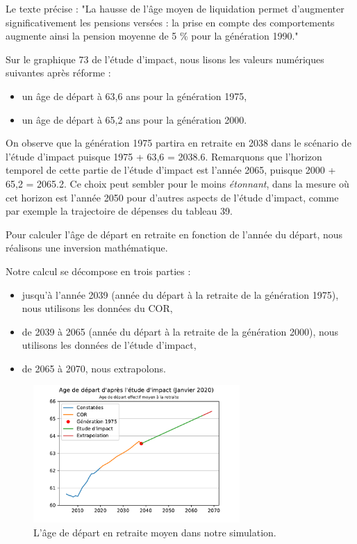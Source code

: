 \documentclass[10pt]{article}
\begin{document}
Le texte précise : "La hausse de l’âge moyen de liquidation permet d’augmenter 
significativement les pensions versées : la prise en compte des comportements 
augmente ainsi la pension moyenne de 5 \% pour la génération 1990."

Sur le graphique 73 de l'étude d'impact, nous lisons les valeurs numériques 
suivantes après réforme :
\begin{itemize}
\item un âge de départ à 63,6 ans pour la génération 1975,
\item un âge de départ à 65,2 ans pour la génération 2000.
\end{itemize}

On observe que la génération 1975 partira en retraite en 2038 dans le scénario de l'étude d'impact puisque 1975 + 63,6 = 2038.6.
Remarquons que l'horizon temporel de cette partie de l'étude d'impact est l'année 2065, puisque 2000 + 65,2 = 2065.2. 
Ce choix peut sembler pour le moins \emph{étonnant}, dans la mesure où cet horizon 
est l'année 2050 pour d'autres aspects de l'étude d'impact, 
comme par exemple la trajectoire de dépenses du tableau 39. 

Pour calculer l'âge de départ en retraite en fonction de l'année du départ, 
nous réalisons une inversion mathématique.  

Notre calcul se décompose en trois parties :
\begin{itemize}
\item jusqu'à l'année 2039 (année du départ à la retraite 
de la génération 1975), nous utilisons les données du COR, 
\item de 2039 à 2065 (année du départ à la retraite de la génération 
2000), nous utilisons les données de l'étude d'impact,
\item de 2065 à 2070, nous extrapolons. 
\end{itemize}


\begin{figure}
\begin{center}
\includegraphics[width=0.7\textwidth]{Simulation-Age.pdf}
\end{center}
\caption{L'âge de départ en retraite moyen dans notre simulation.}
\label{fig-simulation-A}
\end{figure}
\end{document}
